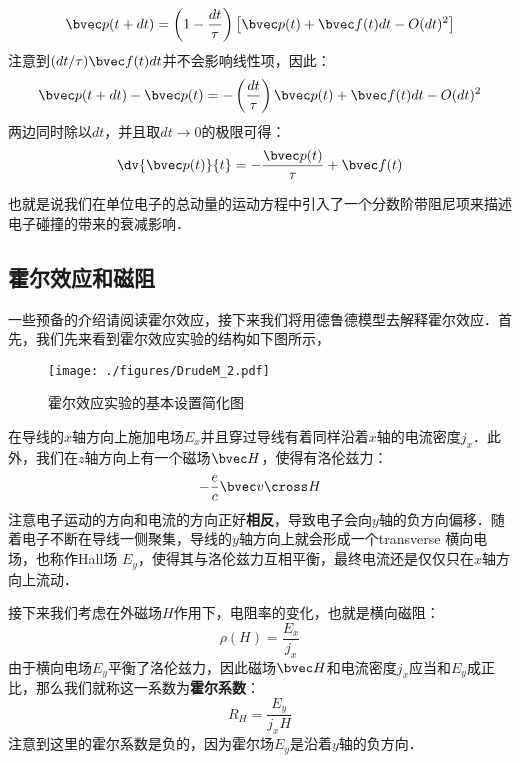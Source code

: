 \begin{equation}
\bvec p(t+dt)=\left(1-\frac{dt}{\tau}\right)\left[\bvec p(t)+\bvec f(t)dt - O(dt)^2\right]
\end{equation}
注意到$(dt/\tau)\bvec f(t)dt$并不会影响线性项，因此：
\begin{equation}
\bvec p(t+dt)-\bvec p(t)=-\left(\frac{dt}{\tau}\right)\bvec p(t)+\bvec f(t)dt - O(dt)^2
\end{equation}
两边同时除以$dt$，并且取$dt\rightarrow 0$的极限可得：
\begin{equation}\label{DrudeM_eq3}
\dv{\bvec p(t)}{t}= -\frac{\bvec p(t)}{\tau}+\bvec f(t)
\end{equation}

也就是说我们在单位电子的总动量的运动方程中引入了一个分数阶带阻尼项来描述电子碰撞的带来的衰减影响．
\subsection{霍尔效应和磁阻}
一些预备的介绍请阅读霍尔效应，接下来我们将用德鲁德模型去解释霍尔效应．首先，我们先来看到霍尔效应实验的结构如下图所示，
\begin{figure}[ht]
\centering
\texttt{[image: ./figures/DrudeM\_2.pdf]}
\caption{霍尔效应实验的基本设置简化图} \label{DrudeM_fig2}
\end{figure}
在导线的$x$轴方向上施加电场$E_x$并且穿过导线有着同样沿着$x$轴的电流密度$j_x$．此外，我们在$z$轴方向上有一个磁场$\bvec H$，使得有洛伦兹力：
\begin{equation}
-\frac{e}{c}\bvec v \cross H
\end{equation}
注意电子运动的方向和电流的方向正好\textbf{相反}，导致电子会向$y$轴的负方向偏移．随着电子不断在导线一侧聚集，导线的$y$轴方向上就会形成一个transverse 横向电场，也称作Hall场 $E_y$，使得其与洛伦兹力互相平衡，最终电流还是仅仅只在$x$轴方向上流动．

接下来我们考虑在外磁场$H$作用下，电阻率的变化，也就是横向磁阻：
\begin{equation}
\rho(H)=\frac{E_x}{j_x}
\end{equation}
由于横向电场$E_y$平衡了洛伦兹力，因此磁场$\bvec H$和电流密度$j_x$应当和$E_y$成正比，那么我们就称这一系数为\textbf{霍尔系数}：
\begin{equation}
R_H = \frac{E_y}{j_xH}
\end{equation}
注意到这里的霍尔系数是负的，因为霍尔场$E_y$是沿着$y$轴的负方向．

